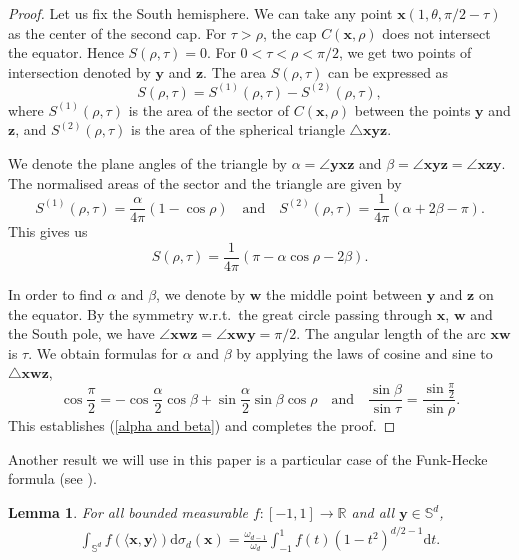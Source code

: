 \documentclass[a4paper,11pt]{amsart}
\newtheorem{lemma}{Lemma}
\begin{document}
\begin{proof}
    Let us fix the South hemisphere. We can take any point $\mathbf{x}(1,\theta,\pi/2-\tau)$ as the center of the second cap. For $\tau>\rho$, the cap $C\left(\mathbf{x},\rho\right)$ does not intersect the equator. Hence $S(\rho,\tau)=0$. For $0<\tau<\rho<\pi/2$, we get two points of intersection denoted by $\mathbf{y}$ and $\mathbf{z}$. The area $S(\rho,\tau)$ can be expressed as
       $$S(\rho,\tau)=S^{(1)}(\rho,\tau)-S^{(2)}(\rho,\tau),$$
where $S^{(1)}(\rho,\tau)$ is the area of the sector of $C(\mathbf{x},\rho)$ between the points $\mathbf{y}$ and $\mathbf{z}$, and $S^{(2)}(\rho,\tau)$ is the area of the spherical triangle $\triangle \mathbf{xyz}$. 

We denote the plane angles of the triangle by $\alpha=\angle \mathbf{yxz}$ and $\beta=\angle \mathbf{xyz}=\angle \mathbf{xzy}$. The normalised areas of the sector and the triangle are given by
 $$S^{(1)}(\rho,\tau)=\frac{\alpha}{4\pi}(1-\cos \rho)\quad \text{and}\quad S^{(2)}(\rho,\tau)=\frac{1}{4\pi}(\alpha+2\beta-\pi).$$
 This gives us 
 $$S(\rho,\tau)=\frac{1}{4\pi}(\pi-\alpha\cos\rho-2\beta).$$

In order to find $\alpha$ and $\beta$, we denote by $\mathbf{w}$ the middle point between $\mathbf{y}$ and $\mathbf{z}$ on the equator. By the symmetry w.r.t.\ the great circle passing through $\mathbf{x}$, $\mathbf{w}$ and the South pole, we have $\angle \mathbf{xwz}=\angle \mathbf{xwy}=\pi/2$. The angular length of the arc $\mathbf{xw}$ is $\tau$. We obtain formulas for $\alpha$ and $\beta$ by applying the laws of cosine and sine to $\triangle \mathbf{xwz}$, 
$$\cos\frac{\pi}{2}=-\cos\frac{\alpha}{2}\cos\beta+\sin\frac{\alpha}{2}\sin\beta\cos\rho\quad \text{and}\quad \frac{\sin\beta}{\sin \tau}=\frac{\sin\frac{\pi}{2}}{\sin\rho}.$$
This establishes (\ref{alpha and beta}) and completes the proof.
\end{proof}

Another result we will use in this paper is a particular case of the Funk-Hecke formula (see \cite{Mller1966}).
\begin{lemma}\label{Funk-Hecke}
For all bounded measurable $f\colon [-1,1]\rightarrow\mathbb{R}$ and all $\mathbf{y}\in\mathbb{S}^d$,
\begin{align*}
    \int_{\mathbb{S}^d}f(\langle \mathbf{x},\mathbf{y}\rangle)\mathrm{d}\sigma_d(\mathbf{x})=\frac{\omega_{d-1}}{\omega_d}\int_{-1}^1 f(t) (1-t^2)^{d/2-1} \mathrm{d}t.
\end{align*}
\end{lemma}
\end{document}
